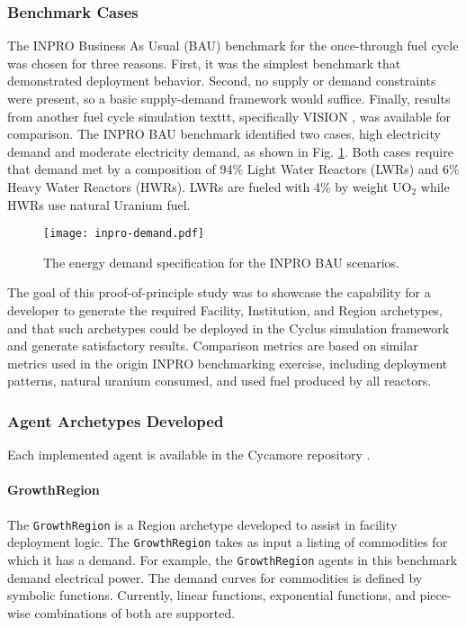 \subsubsection{Benchmark Cases}

The INPRO Business As Usual (BAU) benchmark \cite{_international_2009} for the
once-through fuel cycle was chosen for three reasons. First, it was the simplest
benchmark that demonstrated deployment behavior. Second, no supply or demand
constraints were present, so a basic supply-demand framework would
suffice. Finally, results from another fuel cycle simulation texttt, specifically
VISION \cite{vision2009}, was available for comparison. The INPRO BAU benchmark
identified two cases, high electricity demand and moderate electricity demand,
as shown in Fig. \ref{fig:inpro-demand}. Both cases require that demand met by a
composition of 94\% Light Water Reactors (LWRs) and 6\% Heavy Water Reactors
(HWRs). LWRs are fueled with 4\% by weight UO$_2$ while HWRs use natural Uranium
fuel.

\begin{figure}
  \begin{center}
    \texttt{[image: inpro-demand.pdf]}
    \caption{The energy demand specification for the INPRO BAU scenarios.}
    \label{fig:inpro-demand}
  \end{center}  
\end{figure}

The goal of this proof-of-principle study was to showcase the capability for a
developer to generate the required Facility, Institution, and Region archetypes,
and that such archetypes could be deployed in the Cyclus simulation framework
and generate satisfactory results. Comparison metrics are based on similar
metrics used in the origin INPRO benchmarking exercise, including deployment
patterns, natural uranium consumed, and used fuel produced by all reactors.

\subsubsection{Agent Archetypes Developed}

Each implemented agent is available in the Cycamore repository \cite{cycamore2013}.

\paragraph{GrowthRegion}

The \texttt{GrowthRegion} is a Region archetype developed to assist in
facility deployment logic. The \texttt{GrowthRegion} takes as input a listing of
commodities for which it has a demand. For example, the \texttt{GrowthRegion}
agents in this benchmark demand electrical power. The demand curves for
commodities is defined by symbolic functions. Currently, linear functions,
exponential functions, and piece-wise combinations of both are supported.

